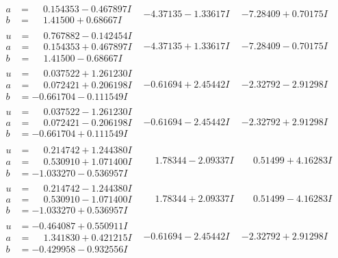 \documentclass[1p]{elsarticle_modified}
\theoremstyle{definition}
\begin{document}
$$\begin{array}{c|c|c}
\begin{aligned}
a &= \phantom{-}0.154353 - 0.467897 I \\
b &= \phantom{-}1.41500 + 0.68667 I\end{aligned}
 & -4.37135 - 1.33617 I & -7.28409 + 0.70175 I \\ \hline\begin{aligned}
u &= \phantom{-}0.767882 - 0.142454 I \\
a &= \phantom{-}0.154353 + 0.467897 I \\
b &= \phantom{-}1.41500 - 0.68667 I\end{aligned}
 & -4.37135 + 1.33617 I & -7.28409 - 0.70175 I \\ \hline\begin{aligned}
u &= \phantom{-}0.037522 + 1.261230 I \\
a &= \phantom{-}0.072421 + 0.206198 I \\
b &= -0.661704 - 0.111549 I\end{aligned}
 & -0.61694 + 2.45442 I & -2.32792 - 2.91298 I \\ \hline\begin{aligned}
u &= \phantom{-}0.037522 - 1.261230 I \\
a &= \phantom{-}0.072421 - 0.206198 I \\
b &= -0.661704 + 0.111549 I\end{aligned}
 & -0.61694 - 2.45442 I & -2.32792 + 2.91298 I \\ \hline\begin{aligned}
u &= \phantom{-}0.214742 + 1.244380 I \\
a &= \phantom{-}0.530910 + 1.071400 I \\
b &= -1.033270 - 0.536957 I\end{aligned}
 & \phantom{-}1.78344 - 2.09337 I & \phantom{-}0.51499 + 4.16283 I \\ \hline\begin{aligned}
u &= \phantom{-}0.214742 - 1.244380 I \\
a &= \phantom{-}0.530910 - 1.071400 I \\
b &= -1.033270 + 0.536957 I\end{aligned}
 & \phantom{-}1.78344 + 2.09337 I & \phantom{-}0.51499 - 4.16283 I \\ \hline\begin{aligned}
u &= -0.464087 + 0.550911 I \\
a &= \phantom{-}1.341830 + 0.421215 I \\
b &= -0.429958 - 0.932556 I\end{aligned}
 & -0.61694 - 2.45442 I & -2.32792 + 2.91298 I \\ \hline\begin{aligned}

\end{aligned}
\end{array}$$
\end{document}
